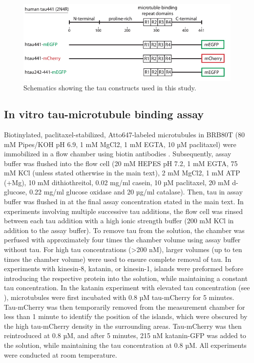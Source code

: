 \begin{figure}[h]
	\centering
	\includegraphics[width=0.6\linewidth]{Figures/tauconstructs.png}
	\caption[Schematics showing the tau constructs used in this study.]{
		Schematics showing the tau constructs used in this study.
		}\label{tauconstructs}
\end{figure}

\subsection{In vitro tau-microtubule binding assay}
Biotinylated, paclitaxel-stabilized, Atto647-labeled microtubules in BRB80T (80 mM Pipes/KOH pH 6.9, 1 mM MgCl2, 1 mM EGTA, 10 µM paclitaxel) were immobilized in a flow chamber using biotin antibodies . Subsequently, assay buffer was flushed into the flow cell (20 mM HEPES pH 7.2, 1 mM EGTA, 75 mM KCl (unless stated otherwise in the main text), 2 mM MgCl2, 1 mM ATP (+Mg), 10 mM dithiothreitol, 0.02 mg/ml casein, 10 µM paclitaxel, 20 mM d-glucose, 0.22 mg/ml glucose oxidase and 20 µg/ml catalase). Then, tau in assay buffer was flushed in at the final assay concentration stated in the main text. In experiments involving multiple successive tau additions, the flow cell was rinsed between each tau addition with a high ionic strength buffer (200 mM KCl in addition to the assay buffer). To remove tau from the solution, the chamber was perfused with approximately four times the chamber volume using assay buffer without tau. For high tau concentrations (>200 nM), larger volumes (up to ten times the chamber volume) were used to ensure complete removal of tau. In experiments with kinesin-8, katanin, or kinesin-1, islands were preformed before introducing the respective protein into the solution, while maintaining a constant tau concentration. In the katanin experiment with elevated tau concentration (see ), microtubules were first incubated with 0.8 µM tau-mCherry for 5 minutes. Tau-mCherry was then temporarily removed from the measurement chamber for less than 1 minute to identify the position of the islands, which were obscured by the high tau-mCherry density in the surrounding areas. Tau-mCherry was then reintroduced at 0.8 µM, and after 5 minutes, 215 nM katanin-GFP was added to the solution, while maintaining the tau concentration at 0.8 µM. All experiments were conducted at room temperature.


